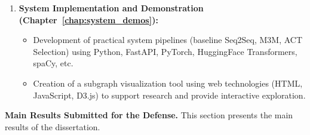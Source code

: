 \begin{enumerate}
\begin{itemize}
    \end{itemize}
    \item \textbf{System Implementation and Demonstration (Chapter~\ref{chap:system_demos}):}
    \begin{itemize}
        \item Development of practical system pipelines (baseline Seq2Seq, M3M, ACT Selection) using Python, FastAPI, PyTorch, HuggingFace Transformers, spaCy, etc.
        \item Creation of a subgraph visualization tool using web technologies (HTML, JavaScript, D3.js) to support research and provide interactive exploration.
    \end{itemize}
\end{enumerate}


\textbf{Main Results Submitted for the Defense.}
This section presents the main results of the dissertation.
